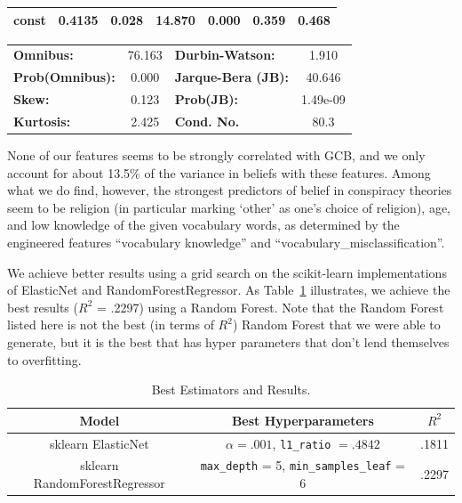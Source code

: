 \documentclass[11pt]{article}
\begin{document}
\begin{table}[ht]
\begin{tabular}{lcccccc}
\textbf{const}                         &       0.4135  &        0.028     &    14.870  &         0.000        &        0.359    &        0.468     \\
\bottomrule
\end{tabular}
\begin{tabular}{lclc}
\textbf{Omnibus:}       & 76.163 & \textbf{  Durbin-Watson:     } &    1.910  \\
\textbf{Prob(Omnibus):} &  0.000 & \textbf{  Jarque-Bera (JB):  } &   40.646  \\
\textbf{Skew:}          &  0.123 & \textbf{  Prob(JB):          } & 1.49e-09  \\
\textbf{Kurtosis:}      &  2.425 & \textbf{  Cond. No.          } &     80.3  \\
\bottomrule
\end{tabular}
\end{table}

None of our features seems to be strongly correlated with GCB, and we
only account for about 13.5\% of the variance in beliefs with these
features. Among what we do find, however, the strongest predictors of
belief in conspiracy theories seem to be religion (in particular marking
`other' as one's choice of religion), age, and low knowledge of the given
vocabulary words, as determined by the engineered features ``vocabulary
knowledge'' and ``vocabulary\_misclassification''.

We achieve better results using a grid search on the scikit-learn implementations
of ElasticNet and RandomForestRegressor. As Table~\ref{tab:hyper} illustrates, we achieve the best results (\(R^2\) =
.2297) using a Random Forest. Note that the Random
Forest listed here is not the best (in terms of \(R^2\)) Random Forest
that we were able to generate, but it is the best that has hyper
parameters that don't lend themselves to overfitting. 

\begin{table}[ht]
	\centering
	\caption{Best Estimators and Results.} \label{tab:hyper} 
	\vspace{1mm}
\begin{tabular}{ |c|c|c| } 
       \hline
       Model & Best Hyperparameters & $R^2$ \\ 
       \hline
       sklearn ElasticNet & $\alpha = .001$, \verb|l1_ratio| $= .4842$ & .1811 \\ 
       sklearn RandomForestRegressor & \verb|max_depth| = 5, \verb|min_samples_leaf| = 6 & .2297 \\
       \hline
	\end{tabular}
\end{table}
\end{document}
